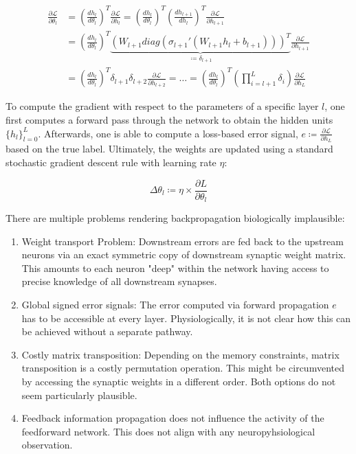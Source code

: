 \documentclass[colorinlistoftodos]{article}
\theoremstyle{definition}
\begin{document}
\begin{align*}
	\frac{\partial \mathcal{L}}{\partial \theta_l} &= \left(\frac{dh_{l}}{d \theta_{l}}\right)^T \frac{\partial \mathcal{L}}{\partial h_{l}} = \left(\frac{dh_{l}}{d \theta_{l}}\right)^T \left(\frac{dh_{l+1}}{d h_{l}}\right)^T \frac{\partial \mathcal{L}}{\partial h_{l+1}} \\ 
	&=  \left(\frac{dh_{l}}{d \theta_{l}}\right)^T \underbrace{\left(W_{l+1} diag\left(\sigma_{l+1}'(W_{l+1}h_l +b_{l+1})\right)\right)^T}_{\coloneqq \delta_{l+1}} \frac{\partial \mathcal{L}}{\partial h_{l+1}} \\
	&= \left(\frac{dh_{l}}{d \theta_{l}}\right)^T \delta_{l+1} \delta_{l+2}\frac{\partial \mathcal{L}}{\partial h_{l+2}} = \dots =  \left(\frac{dh_{l}}{d \theta_{l}}\right)^T \left(\prod_{i=l+1}^L \delta_i\right) \frac{\partial \mathcal{L}}{\partial h_{L}}
\end{align*}

To compute the gradient with respect to the parameters of a specific layer $l$, one first computes a forward pass through the network to obtain the hidden units $\{h_l\}_{l=0}^L$. Afterwards, one is able to compute a loss-based error signal, $e \coloneqq \frac{\partial \mathcal{L}}{\partial h_{L}}$ based on the true label. Ultimately, the weights are updated using a standard stochastic gradient descent rule with learning rate $\eta$:

$$\Delta \theta_l \coloneqq \eta \times \frac{\partial L}{\partial \theta_l}$$

There are multiple problems rendering backpropagation biologically implausible: 

\begin{enumerate}
	\item Weight transport Problem: Downstream errors are fed back to the upstream neurons via an exact symmetric copy of downstream synaptic weight matrix. This amounts to each neuron "deep" within the network having access to precise knowledge of all downstream synapses.
	\item Global signed error signals: The error computed via forward propagation $e$ has to be accessible at every layer. Physiologically, it is not clear how this can be achieved without a separate pathway.
	\item Costly matrix transposition: Depending on the memory constraints, matrix transposition is a costly permutation operation. This might be circumvented by accessing the synaptic weights in a different order. Both options do not seem particularly plausible.
	\item Feedback information propagation does not influence the activity of the feedforward network. This does not align with any neuropyhsiological observation.
\end{enumerate}
\end{document}
